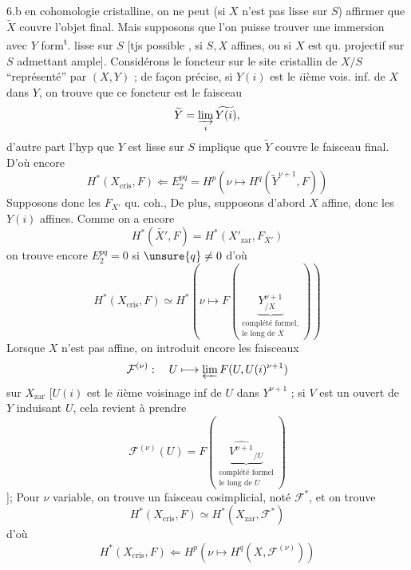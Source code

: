 6.b  en cohomologie cristalline, on ne peut (si $X$ n'est pas  lisse sur $S$) affirmer que $\widetilde X$ couvre l'objet final. Mais supposons que l'on puisse trouver une immersion
avec $Y$ form\textsuperscript{t}. lisse sur $S$ [tjs possible ,  si $S,X$ affines, ou si $X$ est qu. projectif sur $S$  admettant  ample]. Considérons le foncteur sur le site cristallin de $X/S$ ``représenté'' par $(X,Y)$ ; de façon précise, si $Y(i)$ est le $i$ième vois. inf. de $X$ dans $Y$, on trouve que ce foncteur est le faisceau
\[
\widetilde Y=\varinjlim_i\widetilde{Y(i)},
\]
d'autre part l'hyp que $Y$ est  lisse sur $S$ implique que $\widetilde Y$ couvre le faisceau final. D'où encore
\[
H^*(X_{\mathrm{cris}},F)\Longleftarrow E_2^{pq}=H^p(\nu\longmapsto H^q(\widetilde Y^{\nu+1},F))
\]
Supposons donc les $F_{X'}$ qu. coh.,  De plus, supposons d'abord $X$ affine, donc les $Y(i)$ affines.  Comme on a encore
\[
H^*(\widetilde{X'},F)=H^*(X'_{\mathrm{zar}},F_{X'})
\]
on trouve encore $E_2^{pq}=0$ si $\unsure{q}\ne0$ d'où
\[
H^*(X_{\mathrm{cris}},F)\simeq H^*(\nu\longmapsto F(\underbrace{Y^{\nu+1}_{/X}}_{\substack{\text{complété formel,}\\\text{le long de }X}}))
\]
Lorsque $X$ n'est pas affine, on introduit encore les faisceaux
\[
\mathcal F^{(\nu)}:\quad U\longmapsto\varprojlim F(U,U(i)^{\nu+1})
\]
sur $X_{\mathrm{zar}}$ [$U(i)$ est le $i$ième voisinage inf de $U$ dans $Y^{\nu+1}$ ; si $V$ est un ouvert de $Y$ induisant $U$, cela revient à prendre
\[
\mathcal F^{(\nu)}(U)=F(\underbrace{\widehat{V^{\nu+1}}_{/U}}_{\substack{\text{complété formel}\\\text{le long de }U}})
\]
];
Pour $\nu$ variable, on trouve un faisceau cosimplicial,  noté $\mathcal F^*$, et on trouve
\[
H^*(X_{\mathrm{cris}},F)\simeq H^*(X_{\mathrm{zar}},\mathcal F^*)
\]
d'où
\[
H^*(X_{\mathrm{cris}},F)\Longleftarrow H^p(\nu\longmapsto H^q(X,\mathcal F^{(\nu)}))
\]
